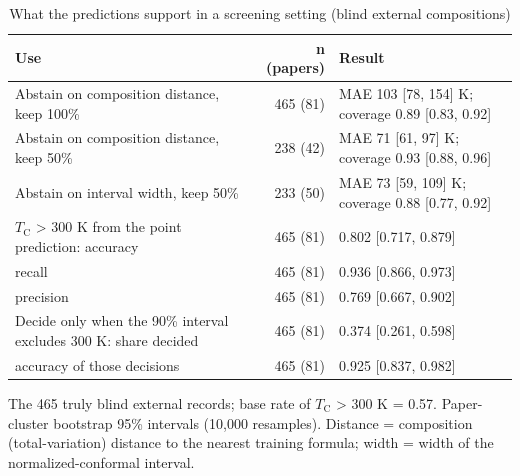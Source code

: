\begin{table}
\caption{What the predictions support in a screening setting (blind external compositions)}
\label{tab:table8_screening}
\tablefont
\begin{tabularx}{\textwidth}{@{}>{\raggedright\arraybackslash}Xrl@{}}
\toprule
\textbf{Use} & \textbf{n (papers)} & \textbf{Result} \\
\midrule
Abstain on composition distance, keep 100\% & 465 (81) & MAE 103 [78, 154] K; coverage 0.89 [0.83, 0.92] \\
Abstain on composition distance, keep 50\% & 238 (42) & MAE 71 [61, 97] K; coverage 0.93 [0.88, 0.96] \\
Abstain on interval width, keep 50\% & 233 (50) & MAE 73 [59, 109] K; coverage 0.88 [0.77, 0.92] \\
$T_\mathrm{C}$ > 300 K from the point prediction: accuracy & 465 (81) & 0.802 [0.717, 0.879] \\
\quad recall & 465 (81) & 0.936 [0.866, 0.973] \\
\quad precision & 465 (81) & 0.769 [0.667, 0.902] \\
Decide only when the 90\% interval excludes 300 K: share decided & 465 (81) & 0.374 [0.261, 0.598] \\
\quad accuracy of those decisions & 465 (81) & 0.925 [0.837, 0.982] \\
\bottomrule
\end{tabularx}
\par\vspace{4pt}\raggedright\noindent The 465 truly blind external records; base rate of $T_\mathrm{C}$ > 300 K = 0.57. Paper-cluster bootstrap 95\% intervals (10,000 resamples). Distance = composition (total-variation) distance to the nearest training formula; width = width of the normalized-conformal interval.
\end{table}
